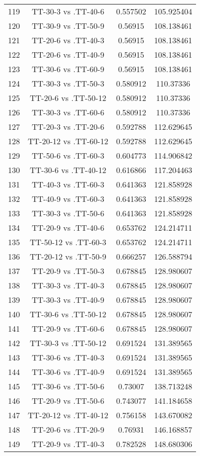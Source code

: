 \documentclass[a4paper,10pt]{article}
\begin{document}
\begin{landscape}
\begin{table}[!htp]
\begin{tabular}{cccc}
119&TT-30-3 vs .TT-40-6&0.557502&105.925404\\
120&TT-30-9 vs .TT-50-9&0.56915&108.138461\\
121&TT-20-6 vs .TT-40-3&0.56915&108.138461\\
122&TT-20-6 vs .TT-40-9&0.56915&108.138461\\
123&TT-30-6 vs .TT-60-9&0.56915&108.138461\\
124&TT-30-3 vs .TT-50-3&0.580912&110.37336\\
125&TT-20-6 vs .TT-50-12&0.580912&110.37336\\
126&TT-30-3 vs .TT-60-6&0.580912&110.37336\\
127&TT-20-3 vs .TT-20-6&0.592788&112.629645\\
128&TT-20-12 vs .TT-60-12&0.592788&112.629645\\
129&TT-50-6 vs .TT-60-3&0.604773&114.906842\\
130&TT-30-6 vs .TT-40-12&0.616866&117.204463\\
131&TT-40-3 vs .TT-60-3&0.641363&121.858928\\
132&TT-40-9 vs .TT-60-3&0.641363&121.858928\\
133&TT-30-3 vs .TT-50-6&0.641363&121.858928\\
134&TT-20-9 vs .TT-40-6&0.653762&124.214711\\
135&TT-50-12 vs .TT-60-3&0.653762&124.214711\\
136&TT-20-12 vs .TT-50-9&0.666257&126.588794\\
137&TT-20-9 vs .TT-50-3&0.678845&128.980607\\
138&TT-30-3 vs .TT-40-3&0.678845&128.980607\\
139&TT-30-3 vs .TT-40-9&0.678845&128.980607\\
140&TT-30-6 vs .TT-50-12&0.678845&128.980607\\
141&TT-20-9 vs .TT-60-6&0.678845&128.980607\\
142&TT-30-3 vs .TT-50-12&0.691524&131.389565\\
143&TT-30-6 vs .TT-40-3&0.691524&131.389565\\
144&TT-30-6 vs .TT-40-9&0.691524&131.389565\\
145&TT-30-6 vs .TT-50-6&0.73007&138.713248\\
146&TT-20-9 vs .TT-50-6&0.743077&141.184658\\
147&TT-20-12 vs .TT-40-12&0.756158&143.670082\\
148&TT-20-6 vs .TT-20-9&0.76931&146.168857\\
149&TT-20-9 vs .TT-40-3&0.782528&148.680306\\

\end{tabular}
\end{table}
\end{landscape}
\end{document}

